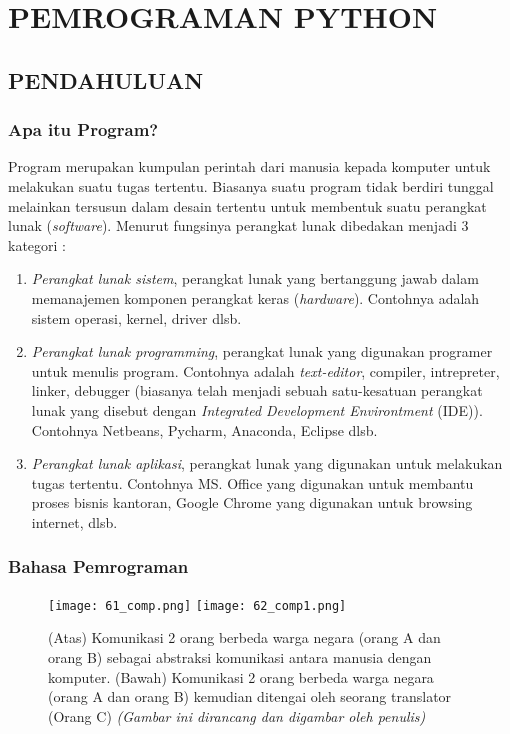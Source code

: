 \part{PEMROGRAMAN PYTHON}

\chapter{PENDAHULUAN}
\setcounter{page}{1}
\section{Apa itu Program?}
Program merupakan kumpulan perintah dari manusia kepada komputer untuk melakukan  suatu tugas tertentu. Biasanya suatu program tidak berdiri tunggal melainkan tersusun dalam desain tertentu untuk membentuk suatu perangkat lunak (\textit{software}). Menurut fungsinya perangkat lunak dibedakan menjadi 3 kategori :

\begin{enumerate}
	\item \textit{Perangkat lunak sistem}, perangkat lunak yang bertanggung jawab dalam memanajemen komponen perangkat keras (\textit{hardware}). Contohnya adalah sistem operasi, kernel, driver dlsb.
	\item \textit{Perangkat lunak programming}, perangkat lunak yang digunakan programer untuk menulis program. Contohnya adalah \textit{text-editor}, compiler, intrepreter, linker, debugger (biasanya telah menjadi sebuah satu-kesatuan perangkat lunak yang disebut dengan \textit{Integrated Development Environtment} (IDE)). Contohnya Netbeans, Pycharm, Anaconda, Eclipse dlsb.
	\item \textit{Perangkat lunak aplikasi}, perangkat lunak yang digunakan untuk melakukan tugas tertentu. Contohnya MS. Office yang digunakan untuk membantu proses bisnis kantoran, Google Chrome yang digunakan untuk browsing internet, dlsb.
\end{enumerate}

\section{Bahasa Pemrograman}
\begin{figure}[hbt!]
    \centering
    \texttt{[image: 61\_comp.png]}
    \texttt{[image: 62\_comp1.png]}
    \caption{(Atas) Komunikasi 2 orang berbeda warga negara (orang A dan orang B) sebagai abstraksi komunikasi antara manusia dengan komputer. (Bawah) Komunikasi 2 orang berbeda warga negara (orang A dan orang B) kemudian ditengai oleh seorang translator (Orang C) \emph{(Gambar ini dirancang dan digambar oleh penulis)}}
    \label{fig:61_comp}
	\end{figure}

